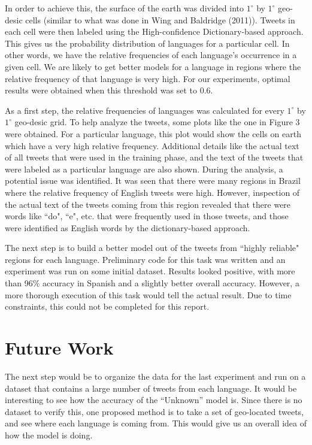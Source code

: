 \documentclass[11pt]{article}
\begin{document}
In order to achieve this, the surface of the earth was divided into $1^{\circ}$ by $1^{\circ}$ geo-desic cells (similar to what was done in Wing and Baldridge (2011)). Tweets in each cell were then labeled using the High-confidence Dictionary-based approach. This gives us the probability distribution of languages for a particular cell. In other words, we have the relative frequencies of each language's occurrence in a given cell. We are likely to get better models for a language in regions where the relative frequency of that language is very high. For our experiments, optimal results were obtained when this threshold was set to 0.6.

As a first step, the relative frequencies of languages was calculated for every $1^{\circ}$ by $1^{\circ}$ geo-desic grid. To help analyze the tweets, some plots like the one in Figure 3 were obtained. For a particular language, this plot would show the cells on earth which have a very high relative frequency. Additional details like the actual text of all tweets that were used in the training phase, and the text of the tweets that were labeled as a particular language are also shown. During the analysis, a potential issue was identified. It was seen that there were many regions in Brazil where the relative frequency of English tweets were high. However, inspection of the actual text of the tweets coming from this region revealed that there were words like ``do", ``e", etc. that were frequently used in those tweets, and those were identified as English words by the dictionary-based approach.

The next step is to build a better model out of the tweets from ``highly reliable" regions for each language. Preliminary code for this task was written and an experiment was run on some initial dataset. Results looked positive, with more than 96\% accuracy in Spanish and a slightly better overall accuracy. However, a more thorough execution of this task would tell the actual result. Due to time constraints, this could not be completed for this report.


\section {Future Work}
The next step would be to organize the data for the last experiment and run on a dataset that contains a large number of tweets from each language. It would be interesting to see how the accuracy of the ``Unknown'' model is. Since there is no dataset to verify this, one proposed method is to take a set of geo-located tweets, and see where each language is coming from. This would give us an overall idea of how the model is doing.
\end{document}

